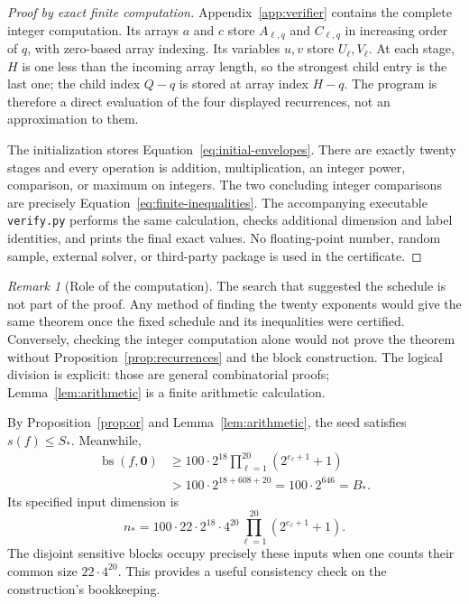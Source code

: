 \documentclass[11pt]{article}
\theoremstyle{definition}
\theoremstyle{remark}
\newtheorem{remark}[theorem]{Remark}
\DeclareMathOperator{\bs}{bs}
\newcommand{\sens}{s}
\newcommand{\zero}{\mathbf{0}}
\begin{document}
\begin{proof}[Proof by exact finite computation]
Appendix~\ref{app:verifier} contains the complete integer computation.
Its arrays $a$ and $c$ store $A_{\ell,q}$ and $C_{\ell,q}$ in
increasing order of $q$, with zero-based array indexing.  Its variables
$u,v$ store $U_\ell,V_\ell$.  At each stage, $H$ is one less than the
incoming array length, so the strongest child entry is the last one;
the child index $Q-q$ is stored at array index $H-q$.  The program is
therefore a direct evaluation of the four displayed recurrences,
not an approximation to them.

The initialization stores Equation~\eqref{eq:initial-envelopes}.
There are exactly twenty stages and every operation is addition,
multiplication, an integer power, comparison, or maximum on integers.
The two concluding integer comparisons are precisely
Equation~\eqref{eq:finite-inequalities}.  The accompanying executable
\texttt{verify.py} performs the same calculation, checks additional
dimension and label identities, and prints the final exact values.
No floating-point number, random sample, external solver, or third-party
package is used in the certificate.
\end{proof}

\begin{remark}[Role of the computation]
The search that suggested the schedule is not part of the proof.  Any
method of finding the twenty exponents would give the same theorem once
the fixed schedule and its inequalities were certified.  Conversely,
checking the integer computation alone would not prove the theorem
without Proposition~\ref{prop:recurrences} and the block construction.
The logical division is explicit: those are general combinatorial
proofs; Lemma~\ref{lem:arithmetic} is a finite arithmetic calculation.
\end{remark}

By Proposition~\ref{prop:or} and Lemma~\ref{lem:arithmetic}, the seed
satisfies $\sens(f)\le S_*$.  Meanwhile,
\begin{align*}
 \bs(f,\zero)
 &\ge 100\cdot2^{18}
            \prod_{\ell=1}^{20}(2^{e_\ell+1}+1)\\
 &>100\cdot2^{18+608+20}
   =100\cdot2^{646}=B_*.
\end{align*}
Its specified input dimension is
\begin{equation}
 n_*=100\cdot22\cdot2^{18}\cdot4^{20}
             \prod_{\ell=1}^{20}(2^{e_\ell+1}+1).
 \label{eq:seed-dimension}
\end{equation}
The disjoint sensitive blocks occupy precisely these inputs when one
counts their common size $22\cdot4^{20}$.  This provides a useful
consistency check on the construction's bookkeeping.
\end{document}

